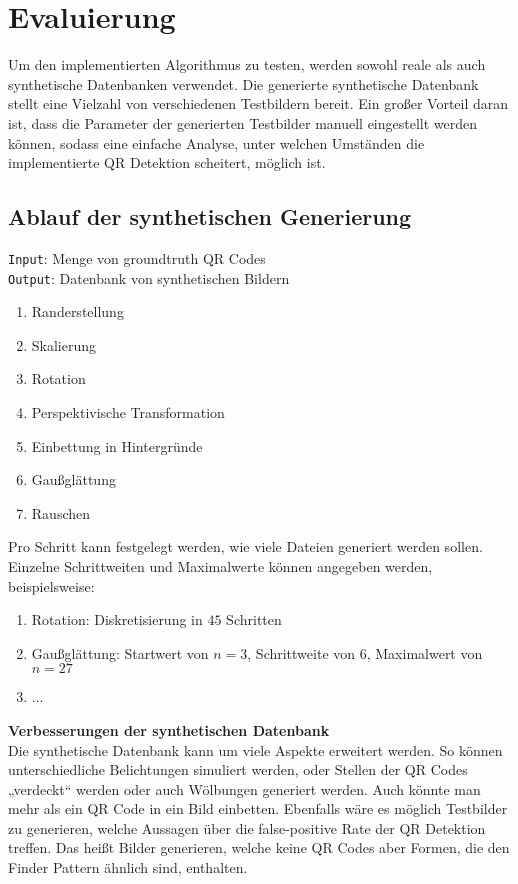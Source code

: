 \chapter{Evaluierung}

Um den implementierten Algorithmus zu testen, werden sowohl reale als auch synthetische Datenbanken verwendet. Die generierte synthetische Datenbank stellt eine Vielzahl von verschiedenen Testbildern bereit. Ein großer Vorteil daran ist, dass die Parameter der generierten Testbilder manuell eingestellt werden können, sodass eine einfache Analyse, unter welchen Umständen die implementierte QR Detektion scheitert, möglich ist.

\section{Ablauf der synthetischen Generierung}

\texttt{Input}: Menge von groundtruth QR Codes \\
\texttt{Output}: Datenbank von synthetischen Bildern

\begin{enumerate}
	\item Randerstellung
	\item Skalierung
	\item Rotation
	\item Perspektivische Transformation
	\item Einbettung in Hintergründe
	\item Gaußglättung
	\item Rauschen
\end{enumerate}


Pro Schritt kann festgelegt werden, wie viele Dateien generiert werden sollen.
Einzelne Schrittweiten und Maximalwerte können angegeben werden, beispielsweise:
\begin{enumerate}
	\item Rotation: Diskretisierung in $45$ Schritten
	\item Gaußglättung: Startwert von $n=3$, Schrittweite von $6$, Maximalwert von $n=27$
	\item ...
\end{enumerate}

\textbf{Verbesserungen der synthetischen Datenbank}\\
Die synthetische Datenbank kann um viele Aspekte erweitert werden. So können unterschiedliche Belichtungen simuliert werden, oder Stellen der QR Codes „verdeckt“ werden oder auch Wölbungen generiert werden. Auch könnte man mehr als ein QR Code in ein Bild einbetten.
Ebenfalls wäre es möglich Testbilder zu generieren, welche Aussagen über die false-positive Rate der QR Detektion treffen. Das heißt Bilder generieren, welche keine QR Codes aber Formen, die den Finder Pattern ähnlich sind, enthalten.

